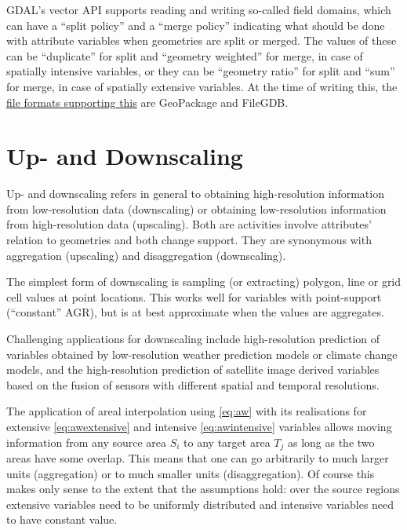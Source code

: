 \documentclass[]{book}
\begin{document}
GDAL's vector API supports reading and writing so-called field
domains, which can have a ``split policy'' and a ``merge policy''
indicating what should be done with attribute variables when
geometries are split or merged. The values of these can be
``duplicate'' for split and ``geometry weighted'' for merge, in
case of spatially intensive variables, or they can be ``geometry
ratio'' for split and ``sum'' for merge, in case of spatially
extensive variables. At the time of writing this, the \href{https://github.com/OSGeo/gdal/pull/3638}{file
formats supporting this}
are GeoPackage and FileGDB.

\hypertarget{updownscaling}{%
\section{Up- and Downscaling}\label{updownscaling}}

Up- and downscaling refers in general to obtaining high-resolution
information from low-resolution data (downscaling) or obtaining
low-resolution information from high-resolution data (upscaling).
Both are activities involve attributes' relation to geometries and
both change support. They are synonymous with aggregation (upscaling)
and disaggregation (downscaling).

The simplest form of downscaling is sampling (or extracting)
polygon, line or grid cell values at point locations. This works
well for variables with point-support (``constant'' AGR), but is at
best approximate when the values are aggregates.

Challenging applications for downscaling include high-resolution
prediction of variables obtained by low-resolution weather prediction
models or climate change models, and the high-resolution prediction
of satellite image derived variables based on the fusion of sensors
with different spatial and temporal resolutions.

The application of areal interpolation using \eqref{eq:aw} with
its realisations for extensive \eqref{eq:awextensive} and intensive
\eqref{eq:awintensive} variables allows moving information from any
source area \(S_i\) to any target area \(T_j\) as long as the two areas
have some overlap. This means that one can go arbitrarily to much
larger units (aggregation) or to much smaller units (disaggregation).
Of course this makes only sense to the extent that the assumptions
hold: over the source regions extensive variables need to be
uniformly distributed and intensive variables need to have constant
value.
\end{document}
